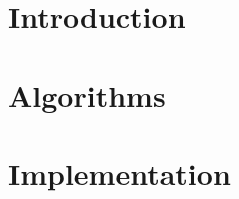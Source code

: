 \documentclass{report}
\title{}
\author{}
\date{}
\begin{document}

\tableofcontents
\chapter{Introduction}


\chapter{Algorithms}


\chapter{Implementation}


\printbibliography
\end{document}
